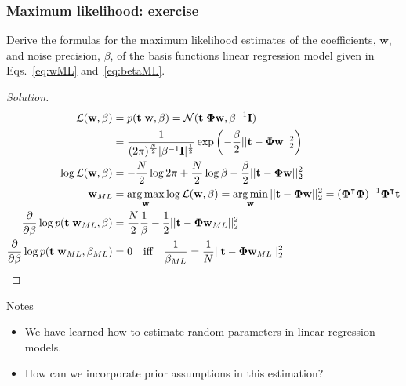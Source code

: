 \begin{frame}
    \frametitle{Maximum likelihood: exercise}

    \scriptsize
    \begin{probExercise}
        Derive the formulas for the maximum likelihood estimates of the
        coefficients, $\mathbf{w}$, and noise precision, $\beta$, of the basis
        functions linear regression model given in Eqs.~\ref{eq:wML}
        and~\ref{eq:betaML}.
    \end{probExercise}

    \tiny
    \begin{proof}[Solution]
        \begin{align*}
            \mathcal{L}(\mathbf{w},\beta)&=p(\mathbf{t}|\mathbf{w},\beta)=\mathcal{N}(\mathbf{t}|\boldsymbol{\Phi}\mathbf{w},\beta^{-1}\mathbf{I})\\
                                         &=\frac{1}{(2\pi)^\frac{N}{2}|\beta^{-1}\mathbf{I}|^\frac{1}{2}}\exp\left(-\frac{\beta}{2}||\mathbf{t}-\boldsymbol{\Phi}\mathbf{w}||_2^2\right)\\
            \log\mathcal{L}(\mathbf{w},\beta)&=-\frac{N}{2}\log{2\pi}+\frac{N}{2}\log\beta-\frac{\beta}{2}||\mathbf{t}-\boldsymbol{\Phi}\mathbf{w}||_2^2\\
            \mathbf{w}_{ML}&=\operatorname*{arg\,max}_{\mathbf{w}}\log\mathcal{L}(\mathbf{w},\beta)=\operatorname*{arg\,min}_{\mathbf{w}}||\mathbf{t}-\boldsymbol{\Phi}\mathbf{w}||_2^2=(\boldsymbol{\Phi}^\intercal\boldsymbol{\Phi})^{-1}\boldsymbol{\Phi}^\intercal\mathbf{t}\\
            \frac{\partial}{\partial\beta}\log p(\mathbf{t}|\mathbf{w}_{ML},\beta)&=\frac{N}{2}\frac{1}{\beta}-\frac{1}{2}||\mathbf{t}-\boldsymbol{\Phi}\mathbf{w}_{ML}||_2^2\\
            \frac{\partial}{\partial\beta}\log
            p(\mathbf{t}|\mathbf{w}_{ML},\beta_{ML})&=0\quad\text{iff}\quad\frac{1}{\beta_{ML}}=\frac{1}{N}||\mathbf{t}-\boldsymbol{\Phi}\mathbf{w}_{ML}||_2^2
        \end{align*}
		\phantom\qedhere
    \end{proof}
    \normalsize
\end{frame}

\begin{frame}

\begin{alertblock}{Notes}
    \begin{itemize}
        \item We have learned how to estimate random parameters in linear
            regression models.
        \item How can we incorporate prior assumptions in this estimation?
    \end{itemize}
\end{alertblock}

\end{frame}

